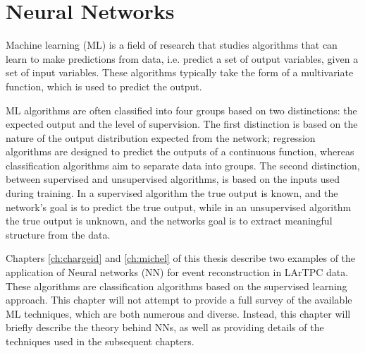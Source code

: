 \chapter{\label{ch:ml}Neural Networks} 

\minitoc

\noindent
Machine learning (ML) is a field of research that studies algorithms that
can learn to make predictions from data, i.e. predict a set of output variables,
given a set of input variables. These algorithms typically take the form of a
multivariate function, which is used to predict the output\cite{Reed1999}.

ML algorithms are often classified into four groups based on two distinctions:
the expected output and the level of supervision. The first distinction is 
based on the nature of the output distribution expected from the network; 
regression algorithms are designed to predict the outputs of a continuous 
function, whereas classification algorithms aim to separate data into groups. 
The second distinction, between supervised and unsupervised algorithms, is 
based on the inputs used during training. In a supervised algorithm the true 
output is known, and the network's goal is to predict the true output, while 
in an unsupervised algorithm the true output is unknown, and the networks goal 
is to extract meaningful structure from the data\cite{Lecun2015}.

Chapters \ref{ch:chargeid} and \ref{ch:michel} of this thesis describe two 
examples of the application of Neural networks (NN) for event reconstruction 
in LArTPC data. These algorithms are classification algorithms based on the
supervised learning approach. This chapter will not attempt to provide a full 
survey of the available ML techniques, which are both numerous and diverse. 
Instead, this chapter will briefly describe the theory behind NNs, as well as 
providing details of the techniques used in the subsequent chapters. 


